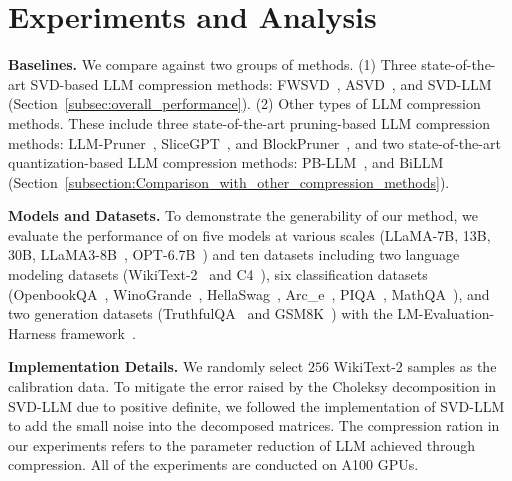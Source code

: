 \section{Experiments and Analysis}
\label{sec:experiments}
\accuracyTable
\textbf{Baselines.} 
We compare \sysname against two groups of methods. (1) Three state-of-the-art SVD-based LLM compression methods: FWSVD~\citep{DBLP:conf/iclr/HsuHCLSJ22}, ASVD~\citep{DBLP:journals/corr/abs-2312-05821}, and SVD-LLM~\citep{DBLP:journals/corr/abs-2403-07378} (Section~\ref{subsec:overall_performance}). (2) Other types of LLM compression methods. These include three state-of-the-art pruning-based LLM compression methods: LLM-Pruner~\citep{DBLP:conf/nips/MaFW23}, SliceGPT~\citep{DBLP:conf/iclr/AshkboosCNHH24}, and BlockPruner~\citep{DBLP:journals/corr/abs-2406-10594}, and two state-of-the-art quantization-based LLM compression methods: PB-LLM~\citep{DBLP:conf/iclr/YuanSD24}, and BiLLM~\citep{DBLP:conf/icml/HuangLQLZ0M024} (Section~\ref{subsection:Comparison_with_other_compression_methods}).

\vspace{1mm}
\noindent\textbf{Models and Datasets.} To demonstrate the generability of our method, we evaluate the performance of \sysname on five models at various scales (LLaMA-7B, 13B, 30B, LLaMA3-8B~\citep{DBLP:journals/corr/abs-2307-09288}, OPT-6.7B~\citep{DBLP:journals/corr/abs-2205-01068}) and ten datasets including two language modeling datasets (WikiText-2~\citep{DBLP:conf/iclr/MerityX0S17} and C4~\citep{DBLP:journals/jmlr/RaffelSRLNMZLL20}), six classification datasets (OpenbookQA~\citep{DBLP:conf/emnlp/MihaylovCKS18}, WinoGrande~\citep{DBLP:conf/aaai/SakaguchiBBC20}, HellaSwag~\citep{DBLP:conf/acl/ZellersHBFC19}, Arc\_e~\citep{DBLP:journals/corr/abs-1803-05457}, PIQA~\citep{DBLP:conf/aaai/BiskZLGC20}, MathQA~\citep{DBLP:conf/naacl/AminiGLKCH19}),  and two generation datasets (TruthfulQA~\citep{DBLP:conf/acl/LinHE22} and GSM8K~\citep{DBLP:journals/corr/abs-2110-14168})  with the LM-Evaluation-Harness framework~\citep{eval-harness}.

\vspace{1mm}
\noindent\textbf{Implementation Details.} 
We randomly select $256$ WikiText-2 samples as the calibration data. To mitigate the error raised by the Choleksy decomposition in SVD-LLM due to positive definite, we followed the implementation of SVD-LLM~\citep{DBLP:journals/corr/abs-2403-07378} to add the small noise into the decomposed matrices. The compression ration in our experiments refers to the parameter reduction of LLM achieved through compression. All of the experiments are conducted on A100 GPUs.

